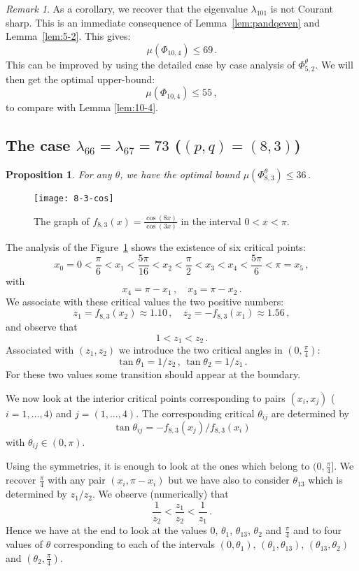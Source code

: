 \documentclass[a4paper,reqno,11pt]{amsart}
\newtheorem{prop}[thm]{Proposition}
\theoremstyle{remark}
\newtheorem{remark}[thm]{Remark}
\theoremstyle{definition}
\numberwithin{equation}{section}
\begin{document}
\begin{remark}
As a corollary, we recover that
the eigenvalue $\lambda_{101}$ is not Courant sharp.
This is an immediate consequence of 
Lemma~\ref{lem:pandqeven} and Lemma~\ref{lem:5-2}. This gives:
\[
\mu(\Phi_{10,4}) \leq 69\,.
\]
This can be improved by using the detailed case by case analysis of 
$\Phi^\theta_{5,2}$. We will then get the optimal upper-bound:
\[
\mu(\Phi_{10,4}) \leq 55 \,,
\]
to compare with Lemma \ref{lem:10-4}.
\end{remark}

\subsection{The case $\lambda_{66}=\lambda_{67}= 73$ ($(p,q)= (8,3)$)}

\begin{prop}
\label{lem:8-3-opt}
For any $\theta$, we have the optimal bound  $\mu(\Phi_{8,3}^\theta) \leq 36\,$. 
\end{prop}

\begin{figure}[ht]
\centering
\texttt{[image: 8-3-cos]}
\caption{The graph of $f_{8,3}(x)=\frac{\cos(8x)}{\cos(3x)}$ in the interval 
$0<x<\pi$.}
\label{fig:8-3-cos}
\end{figure}

The analysis of the Figure~\ref{fig:8-3-cos} shows the existence of six 
critical points:
\[
x_0=0<\frac \pi 6 < x_1 < \frac{5\pi}{16} < x_2
< \frac \pi 2 < x_3 < x_4< \frac{5\pi}{6} < \pi=x_5\,,
\]
with 
\[
x_4=\pi -x_1\,,\quad x_3=\pi -x_2\,.
\]
We associate with  these critical values the two positive numbers:
\[
z_1= f_{8,3} (x_2)\approx 1.10\,,\quad z_2 = - f_{8,3} (x_1)\approx 1.56\,,
\]
and observe that
\[
1 < z_1 < z_2\,.
\]
Associated with $( z_1,z_2)$ we introduce the two critical angles   
in $(0,\frac \pi 4)$:
\[
 \tan \theta_1= 1/z_2\,, \,\tan \theta_2 = 1/z_1\,.
\]
For these two values some transition should appear at the boundary.

We now look at the interior critical points corresponding to pairs 
$(x_i,x_j)$ ($i=1,\dots, 4)$ and $j=(1,\dots,4)$.  The corresponding critical
 $\theta_{ij}$ are determined by 
\[
 \tan \theta_{ij} = - f_{8,3} (x_j)/ f_{8,3} (x_i)
\]
 with $\theta_{ij} \in (0,\pi)$.
 
Using the symmetries, it is enough to look at the ones which belong to 
$(0,\frac \pi 4]$. We recover $\frac \pi 4$ with any pair $(x_i, \pi -x_i)$
but we have also to consider $ \theta_{13}$ which is determined by $z_1/z_2$. 
We observe (numerically) that
\[
   \frac {1}{z_2} < \frac{z_1}{z_2} < \frac{1}{z_1}\,.
\]
Hence we have at the end to look at the values 
$0$, $\theta_1$, $\theta_{13}$,  $\theta_2$ and $\frac \pi 4$ and to four 
values of $\theta$ corresponding to each of the intervals $(0,\theta_{1})$, 
$(\theta_{1}, \theta_{13})$, $(\theta_{13},\theta_2)$ and 
$(\theta_2,\frac \pi 4)$.
\end{document}
